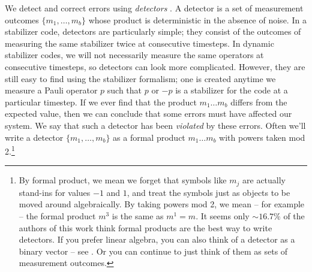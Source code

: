 We detect and correct errors using \textit{detectors}
\cite{Gidney2021stimfaststabilizer,derks2024}.
A detector is a set of measurement outcomes $\{m_1, \ldots, m_b\}$ whose product is deterministic in the absence of noise.
In a stabilizer code, detectors are particularly simple;
they consist of the outcomes of measuring the same stabilizer twice at consecutive timesteps. In dynamic stabilizer codes, we will not necessarily measure the same operators at consecutive timesteps,
so detectors can look more complicated. 
However, they are still easy to find using the stabilizer formalism;
one is created anytime we measure a Pauli operator $p$ such that
$p$ or $-p$ is a stabilizer for the code at a particular timestep.
If we ever find that the product $m_1 \ldots m_b$ differs from the expected value,
then we can conclude that some errors must have affected our system.
We say that such a detector has been \textit{violated} by these errors.
Often we'll write a detector $\{m_1, \ldots, m_b\}$ as a formal product $m_1 \ldots m_b$ with powers taken mod 2.\footnote{%
    By formal product, we mean we forget that symbols like $m_j$ are actually stand-ins for values $-1$ and $1$,
    and treat the symbols just as objects to be moved around algebraically.
    By taking powers mod 2, we mean -- for example -- the formal product $m^3$ is the same as $m^1 =  m$.
    It seems only ${\sim}16.7\%$ of the authors of this work think formal products are the best way to write detectors.
    If you prefer linear algebra,
    you can also think of a detector as a binary vector -- see .
    Or you can continue to just think of them as sets of measurement outcomes.}

